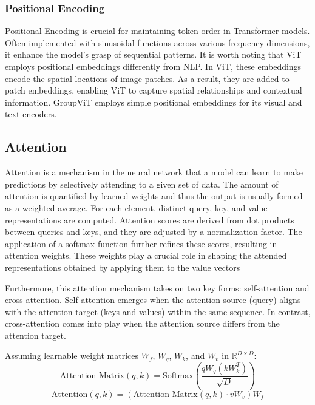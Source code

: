 \subsubsection{Positional Encoding}

Positional Encoding is crucial for maintaining token order in Transformer models. Often implemented with sinusoidal functions across various frequency dimensions, it enhance the model's grasp of sequential patterns. It is worth noting that ViT employs positional embeddings differently from NLP. In ViT, these embeddings encode the spatial locations of image patches. As a result, they are added to patch embeddings, enabling ViT to capture spatial relationships and contextual information. GroupViT employs simple positional embeddings for its visual and text encoders.

\subsection{Attention}
Attention is a mechanism in the neural network that a model can learn to make predictions by selectively attending to a given set of data. The amount of attention is quantified by learned weights and thus the output is usually formed as a weighted average\cite{weng2020transformer}.
For each element, distinct query, key, and value representations are computed. Attention scores are derived from dot products between queries and keys, and they are adjusted by a normalization factor. The application of a softmax function further refines these scores, resulting in attention weights. These weights play a crucial role in shaping the attended representations obtained by applying them to the value vectors

Furthermore, this attention mechanism takes on two key forms: self-attention and cross-attention. Self-attention emerges when the attention source (query) aligns with the attention target (keys and values) within the same sequence. In contrast, cross-attention comes into play when the attention source differs from the attention target.

Assuming learnable weight matrices \(W_f\), \(W_q\), \(W_k\), and \(W_v\) in \(\mathbb{R}^{D \times D}\):
\begin{equation}
    \text{Attention\_Matrix}(q, k) = \text{Softmax}\left(\frac{qW_q(kW_k^T)}{\sqrt{D}}\right)
\end{equation}
\begin{equation}
\label{eq:attn}
    \text{Attention}(q, k) = \left(\text{Attention\_Matrix}(q, k) \cdot vW_v\right)W_f
\end{equation}

